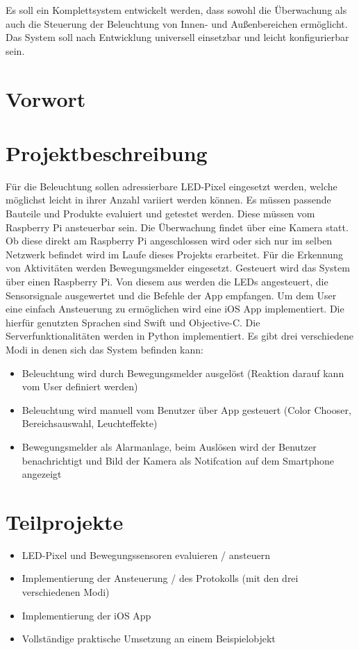 
Es soll ein Komplettsystem entwickelt werden, dass sowohl die Überwachung als auch die Steuerung der Beleuchtung von Innen- und Außenbereichen ermöglicht. Das System soll nach Entwicklung universell einsetzbar und leicht konfigurierbar sein. 
\section{Vorwort}
\section{Projektbeschreibung}
Für die Beleuchtung sollen adressierbare LED-Pixel eingesetzt werden, welche möglichst leicht in ihrer Anzahl variiert werden können. Es müssen passende Bauteile und Produkte evaluiert und getestet werden. Diese müssen vom Raspberry Pi ansteuerbar sein.
Die Überwachung findet über eine Kamera statt. Ob diese direkt am Raspberry Pi angeschlossen wird oder sich nur im selben Netzwerk befindet wird im Laufe dieses Projekts erarbeitet. Für die Erkennung von Aktivitäten werden Bewegungsmelder eingesetzt. 
Gesteuert wird das System über einen Raspberry Pi. Von diesem aus werden die LEDs angesteuert, die Sensorsignale ausgewertet und die Befehle der App empfangen.
Um dem User eine einfach Ansteuerung zu ermöglichen wird eine iOS App implementiert. Die hierfür genutzten Sprachen sind Swift und Objective-C. Die Serverfunktionalitäten werden in Python implementiert.
Es gibt drei verschiedene Modi in denen sich das System befinden kann:
\begin{itemize}
\item Beleuchtung wird durch Bewegungsmelder ausgelöst (Reaktion darauf kann vom User definiert werden)
\item Beleuchtung wird manuell vom Benutzer über App gesteuert (Color Chooser, Bereichsauswahl, Leuchteffekte)
\item Bewegungsmelder als Alarmanlage, beim Auslösen wird der Benutzer benachrichtigt und Bild der Kamera als Notifcation auf dem Smartphone angezeigt
\end{itemize}

\section{Teilprojekte}
\begin{itemize}
\item LED-Pixel und Bewegungssensoren evaluieren / ansteuern
\item Implementierung der Ansteuerung / des Protokolls (mit den drei verschiedenen Modi)
\item Implementierung der iOS App
\item Vollständige praktische Umsetzung an einem Beispielobjekt
\end{itemize}
